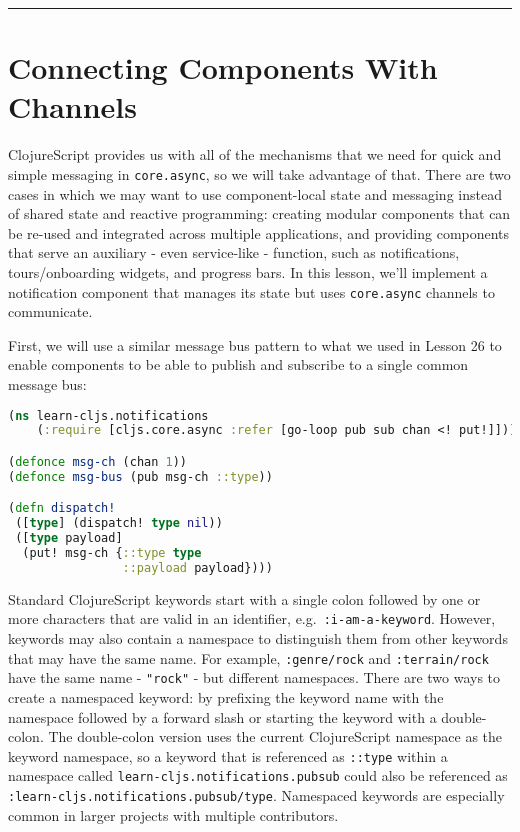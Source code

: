 \documentclass[10pt,twoside,openright]{memoir}
\begin{document}
\begin{center}\rule{0.5\linewidth}{0.5pt}\end{center}


\section{Connecting Components With Channels}

ClojureScript provides us with all of the mechanisms that we need for
quick and simple messaging in \texttt{core.async}, so we will take
advantage of that. There are two cases in which we may want to use
component-local state and messaging instead of shared state and reactive
programming: creating modular components that can be re-used and
integrated across multiple applications, and providing components that
serve an auxiliary - even service-like - function, such as
notifications, tours/onboarding widgets, and progress bars. In this
lesson, we'll implement a notification component that manages its state
but uses \texttt{core.async} channels to communicate.

First, we will use a similar message bus pattern to what we used in
Lesson 26 to enable components to be able to publish and subscribe to a
single common message bus:

\begin{lstlisting}[language=Clojure]
(ns learn-cljs.notifications
    (:require [cljs.core.async :refer [go-loop pub sub chan <! put!]]))

(defonce msg-ch (chan 1))
(defonce msg-bus (pub msg-ch ::type))

(defn dispatch!
 ([type] (dispatch! type nil))
 ([type payload]
  (put! msg-ch {::type type
                ::payload payload})))
\end{lstlisting}

\begin{notice}[title={Namespaced Keywords}]
Standard ClojureScript keywords start with a single colon followed by
one or more characters that are valid in an identifier,
e.g.~\texttt{:i-am-a-keyword}. However, keywords may also contain a
namespace to distinguish them from other keywords that may have the same
name. For example, \texttt{:genre/rock} and \texttt{:terrain/rock} have
the same name - \texttt{"rock"} - but different namespaces. There are
two ways to create a namespaced keyword: by prefixing the keyword name
with the namespace followed by a forward slash or starting the keyword
with a double-colon. The double-colon version uses the current
ClojureScript namespace as the keyword namespace, so a keyword that is
referenced as \texttt{::type} within a namespace called
\texttt{learn-cljs.notifications.pubsub} could also be referenced as
\texttt{:learn-cljs.notifications.pubsub/type}. Namespaced keywords are
especially common in larger projects with multiple contributors.
\end{notice}
\end{document}
